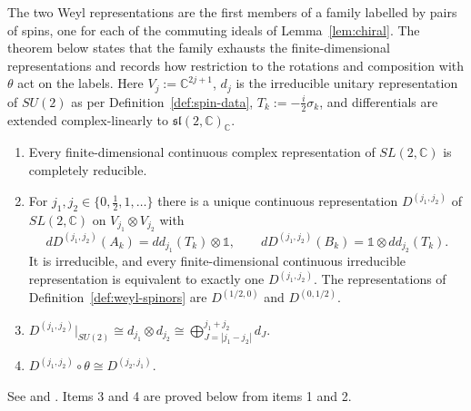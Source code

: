The two Weyl representations are the first members of a family labelled by pairs of spins, one for each of the commuting ideals of Lemma~\ref{lem:chiral}. The theorem below states that the family exhausts the finite-dimensional representations and records how restriction to the rotations and composition with $\theta$ act on the labels. Here $V_j:=\mathbb{C}^{2j+1}$, $d_j$ is the irreducible unitary representation of $SU(2)$ as per Definition~\ref{def:spin-data}, $T_k:=-\tfrac{i}{2}\sigma_k$, and differentials are extended complex-linearly to $\mathfrak{sl}(2,\mathbb{C})_{\mathbb{C}}$.

\begin{theorem}\label{thm:finite-reps}
	\begin{enumerate}
		\item Every finite-dimensional continuous complex representation of $SL(2,\mathbb{C})$ is completely reducible.
		\item For $j_1,j_2\in\{0,\frac12,1,\dots\}$ there is a unique continuous representation $D^{(j_1,j_2)}$ of $SL(2,\mathbb{C})$ on $V_{j_1}\otimes V_{j_2}$ with
		\begin{equation*}
			dD^{(j_1,j_2)}(A_k)=dd_{j_1}(T_k)\otimes\mathbb{1}, \qquad dD^{(j_1,j_2)}(B_k)=\mathbb{1}\otimes dd_{j_2}(T_k).
		\end{equation*}
		It is irreducible, and every finite-dimensional continuous irreducible representation is equivalent to exactly one $D^{(j_1,j_2)}$. The representations of Definition~\ref{def:weyl-spinors} are $D^{(1/2,0)}$ and $D^{(0,1/2)}$.
		\item $D^{(j_1,j_2)}|_{SU(2)}\cong d_{j_1}\otimes d_{j_2}\cong\bigoplus_{J=|j_1-j_2|}^{j_1+j_2}d_J$.
		\item $D^{(j_1,j_2)}\circ\theta\cong D^{(j_2,j_1)}$.
	\end{enumerate}
\end{theorem}

\noindent See \cite[TODO-location]{TODO-Hal03} and \cite[TODO-location]{TODO-Hum10}. Items 3 and 4 are proved below from items 1 and 2.

